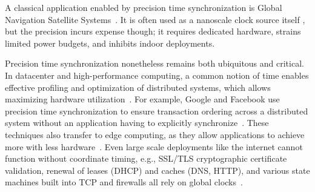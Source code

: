 A classical application enabled by precision time synchronization 
is Global Navigation Satellite Systems~\cite{intro-to-gnss}.
It is often used as a nanoscale clock source itself %
\cite{gnss-location-and-time-advances,gnss-for-high-precision-timing},
but the precision incurs expense though; it requires dedicated hardware, strains limited power budgets, and inhibits indoor deployments.

Precision time synchronization nonetheless remains both ubiquitous and critical.
In datacenter and high-performance computing,
a common notion of time enables effective profiling and optimization of distributed systems,
which allows maximizing hardware utilization~\cite{hpc-understanding-bottlenecks, hpc-solving-io-bottleneck, hpc-diagnosing-io-bottlenecks}.
For example, Google and Facebook use precision time synchronization to ensure transaction ordering across a distributed system without an application having to explicitly synchronize~\cite{corbett2013spanner,li2020sundial,ouellete2023precision}.
These techniques also transfer to edge computing, as they allow applications to achieve more with less hardware~\cite{chen2021achieving, wang2019frame}.
Even large scale deployments like the internet cannot function without coordinate timing,
e.g., SSL/TLS cryptographic certificate validation, renewal of leases (DHCP) and caches (DNS, HTTP), and various state machines built into TCP and firewalls all rely on global clocks~\cite{TODO}.


